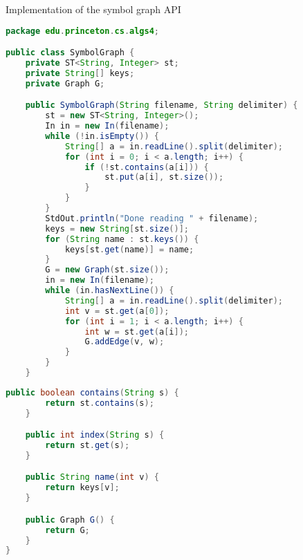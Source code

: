 \documentclass[8pt,a4paper,compress]{beamer}
\begin{document}
\begin{frame}[fragile]
\pause

Implementation of the symbol graph API
\begin{lstlisting}[language=java,style=focusin]
package edu.princeton.cs.algs4;

public class SymbolGraph {
    private ST<String, Integer> st;
    private String[] keys;
    private Graph G;

    public SymbolGraph(String filename, String delimiter) {
        st = new ST<String, Integer>();
        In in = new In(filename);
        while (!in.isEmpty()) {
            String[] a = in.readLine().split(delimiter);
            for (int i = 0; i < a.length; i++) {
                if (!st.contains(a[i])) {
                    st.put(a[i], st.size());
                }
            }
        }
        StdOut.println("Done reading " + filename);
        keys = new String[st.size()];
        for (String name : st.keys()) {
            keys[st.get(name)] = name;
        }
        G = new Graph(st.size());
        in = new In(filename);
        while (in.hasNextLine()) {
            String[] a = in.readLine().split(delimiter);
            int v = st.get(a[0]);
            for (int i = 1; i < a.length; i++) {
                int w = st.get(a[i]);
                G.addEdge(v, w);
            }
        }
    }
\end{lstlisting}
\end{frame}

\begin{frame}[fragile]
\pause

\begin{lstlisting}[language=java,style=focusin]
    public boolean contains(String s) { 
        return st.contains(s); 
    }

    public int index(String s) { 
        return st.get(s); 
    }

    public String name(int v) { 
        return keys[v]; 
    }

    public Graph G() { 
        return G; 
    }
}
\end{lstlisting}
\end{frame}
\end{document}
